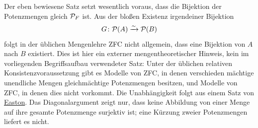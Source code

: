 \documentclass[main.tex]{subfiles}
\begin{document}
\begin{tabproof}
\end{tabproof}

\begin{tabproof}
\end{tabproof}

\begin{remark}
Der eben bewiesene Satz setzt wesentlich voraus, dass die Bijektion der
Potenzmengen gleich \(\mathcal{P}_{F}\) ist.  Aus der bloßen Existenz irgendeiner
Bijektion
\[
  G\colon\mathcal{P}(A)\xrightarrow{\sim}\mathcal{P}(B)
\]
folgt in der üblichen Mengenlehre ZFC nicht allgemein, dass eine Bijektion von
\(A\) nach \(B\) existiert.  Dies ist hier ein externer mengentheoretischer
Hinweis, kein im vorliegenden Begriffsaufbau verwendeter Satz: Unter der
üblichen relativen Konsistenzvoraussetzung gibt es Modelle von ZFC, in denen
verschieden mächtige unendliche Mengen gleichmächtige Potenzmengen besitzen,
und Modelle von ZFC, in denen dies nicht vorkommt.  Die Unabhängigkeit folgt
aus einem Satz von
\href{https://doi.org/10.1016/0003-4843(70)90012-4}{Easton}.  Das
Diagonalargument zeigt nur, dass keine Abbildung von einer Menge auf ihre
gesamte Potenzmenge surjektiv ist; eine Kürzung zweier Potenzmengen liefert es
nicht.
\end{remark}
\end{document}
